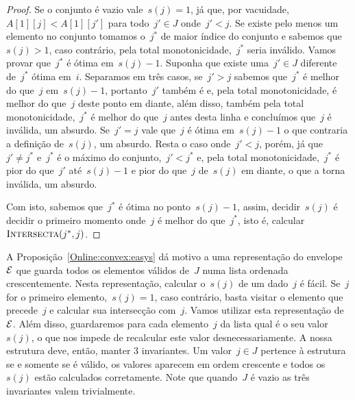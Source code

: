 \begin{proof}
Se o conjunto é vazio vale~$s(j) = 1$, já que, por vacuidade,~$A[1][j] < A[1][j']$ para todo~$j' \in J$ onde~$j' < j$. Se existe pelo menos um elemento no conjunto tomamos o~$j^*$ de maior índice do conjunto e sabemos que~$s(j) > 1$, caso contrário, pela total monotonicidade,~$j^*$ seria inválido. Vamos provar que~$j^*$ é ótima em~$s(j) - 1$. Suponha que existe uma~$j' \in J$ diferente de~$j^*$ ótima em~$i$. Separamos em três casos, se~$j'>j$ sabemos que~$j^*$ é melhor do que~$j$ em~$s(j)-1$, portanto~$j'$ também é e, pela total monotonicidade, é melhor do que~$j$ deste ponto em diante, além disso, também pela total monotonicidade,~$j^*$ é melhor do que~$j$ antes desta linha e concluímos que~$j$ é inválida, um absurdo. Se~$j' = j$ vale que~$j$ é ótima em~$s(j) - 1$ o que contraria a definição de~$s(j)$, um absurdo. Resta o caso onde~$j' < j$, porém, já que~$j' \neq j^*$ e~$j^*$ é o máximo do conjunto,~$j' < j^*$ e, pela total monotonicidade,~$j^*$ é pior do que~$j'$ até~$s(j) - 1$ e pior do que~$j$ de~$s(j)$ em diante, o que a torna inválida, um absurdo.

Com isto, sabemos que~$j^*$ é ótima no ponto~$s(j) - 1$, assim, decidir~$s(j)$ é decidir o primeiro momento onde~$j$ é melhor do que~$j^*$, isto é, calcular~$\textsc{Intersecta}(j^*,j)$.
\end{proof}

A Proposição~\ref{Online:convex:easys} dá motivo a uma representação do envelope~$\mathcal{E}$ que guarda todos os elementos válidos de~$J$ numa lista ordenada crescentemente. Nesta representação, calcular o~$s(j)$ de um dado~$j$ é fácil. Se~$j$ for o primeiro elemento,~$s(j) = 1$, caso contrário, basta visitar o elemento que precede~$j$ e calcular sua intersecção com~$j$. Vamos utilizar esta representação de~$\mathcal{E}$. Além disso, guardaremos para cada elemento~$j$ da lista qual é o seu valor~$s(j)$, o que nos impede de recalcular este valor desnecessariamente. A nossa estrutura deve, então, manter 3 invariantes. Um valor~$j \in J$ pertence à estrutura se e somente se é válido, os valores aparecem em ordem crescente e todos os~$s(j)$ estão calculados corretamente. Note que quando~$J$ é vazio as três invariantes valem trivialmente.

